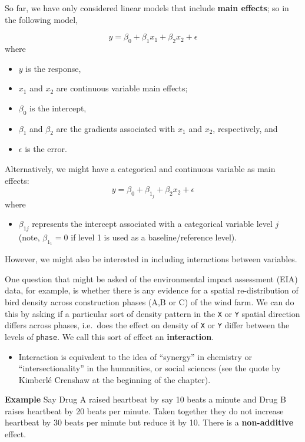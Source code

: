 \documentclass[
  oneside]{krantz}
\providecommand{\tightlist}{%
  \setlength{\itemsep}{0pt}\setlength{\parskip}{0pt}}
\begin{document}
So far, we have only considered linear models that include \textbf{main effects}; so in the following model,

\[y = \beta_0 + \beta_1x_1 + \beta_2 x_2 + \epsilon\]
where

\begin{itemize}
\tightlist
\item
  \(y\) is the response,
\item
  \(x_1\) and \(x_2\) are continuous variable main effects;
\item
  \(\beta_0\) is the intercept,
\item
  \(\beta_1\) and \(\beta_2\) are the gradients associated with \(x_1\) and \(x_2\), respectively, and
\item
  \(\epsilon\) is the error.
\end{itemize}

Alternatively, we might have a categorical and continuous variable as main effects:
\[y = \beta_0 + \beta_{1_j} + \beta_2 x_2 + \epsilon\]
where

\begin{itemize}
\tightlist
\item
  \(\beta_{1j}\) represents the intercept associated with a categorical variable level \(j\) (note, \(\beta_{1_1}=0\) if level 1 is used as a baseline/reference level).
\end{itemize}

However, we might also be interested in including interactions between variables.

One question that might be asked of the environmental impact assessment (EIA) data, for example, is whether there is any evidence for a spatial re-distribution of bird density across construction phases (A,B or C) of the wind farm. We can do this by asking if a particular sort of density pattern in the \texttt{X} or \texttt{Y} spatial direction differs across phases, i.e.~does the effect on density of \texttt{X} or \texttt{Y} differ between the levels of \texttt{phase}. We call this sort of effect an \textbf{interaction}.

\begin{itemize}
\tightlist
\item
  Interaction is equivalent to the idea of ``synergy'' in chemistry or ``intersectionality'' in the humanities, or social sciences (see the quote by Kimberlé Crenshaw at the beginning of the chapter).
\end{itemize}

\textbf{Example} Say Drug A raised heartbeat by say 10 beats a minute and Drug B raises heartbeat by 20 beats per minute. Taken together they do not increase heartbeat by 30 beats per minute but reduce it by 10. There is a \textbf{non-additive} effect.
\end{document}
